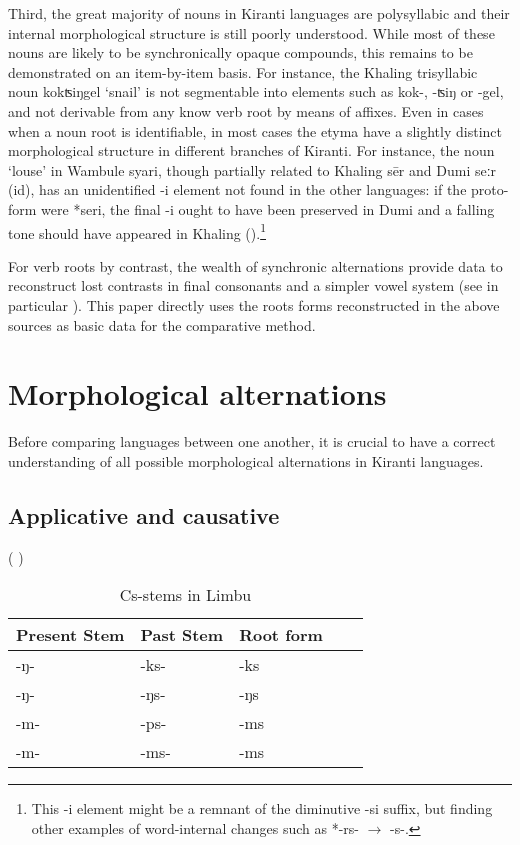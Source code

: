 \documentclass[oldfontcommands,oneside,a4paper,11pt]{article}
\newcommand{\ipa}[1]{{\phon\mbox{#1}}} %
\newcommand{\change}[2]{*\ipa{#1} $\rightarrow$ \ipa{#2}}
\begin{document}
Third, the great majority of nouns in Kiranti languages are polysyllabic and their internal morphological structure is still poorly understood. While most of these nouns are likely to be synchronically opaque compounds, this remains to be demonstrated on an item-by-item basis.  For instance, the Khaling trisyllabic noun \ipa{kokʦiŋgel} `snail' is not segmentable into elements such as \ipa{kok-}, \ipa{-ʦiŋ} or \ipa{-gel}, and not derivable from any know verb root by means of affixes. Even in cases when a noun root is identifiable, in most cases the etyma have a slightly distinct morphological structure in different branches of Kiranti. For instance, the noun `louse' in Wambule \ipa{syari}, though partially related to Khaling \ipa{sēr} and Dumi \ipa{seːr} (id), has an unidentified \ipa{-i} element not found in the other languages: if the proto-form were *\ipa{seri}, the final \ipa{-i} ought to have been preserved in Dumi and a falling tone should have appeared in Khaling (\citealt{jacques16tonogenesis}).\footnote{This \ipa{-i} element might be a remnant of the diminutive \ipa{-si} suffix, but finding other examples of word-internal changes such as \change{-rs-}{-s-}. }

For verb roots by contrast, the wealth of synchronic alternations provide data to reconstruct lost contrasts in final consonants and a simpler vowel system (see in particular \citealt{michailovsky02dico, jacques12khaling, michailovsky12dumi}). This paper directly uses the roots forms reconstructed in the above sources as basic data for the comparative method. 


\section{Morphological alternations} \label{sec:alternations}
Before comparing languages between one another, it is crucial to have a correct understanding of all possible morphological alternations in Kiranti languages. 

\subsection{Applicative and causative} \label{sec:appl}
\citet{michailovsky85dental}

(\citealt{driem87} \citealt[xiii]{michailovsky02dico}) 

\begin{table}[H]
\caption{Cs-stems in Limbu} \centering \label{tab:Cs.limbu}
\begin{tabular}{lllll}
\toprule
Present Stem & Past Stem & Root form \\
\midrule
\ipa{-ŋ-} & \ipa{-ks-} & \ipa{-ks} \\
\ipa{-ŋ-} & \ipa{-ŋs-} & \ipa{-ŋs} \\
\ipa{-m-} & \ipa{-ps-} & \ipa{-ms} \\
\ipa{-m-} & \ipa{-ms-} & \ipa{-ms} \\
\bottomrule
\end{tabular}
\end{table} 
\end{document}
